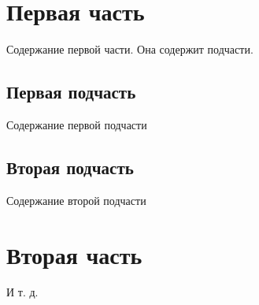 \documentclass[a4paper, 12pt]{article} %
\begin{document}
\section{Первая часть}

Содержание первой части. Она содержит подчасти.

\subsection{Первая подчасть}

Содержание первой подчасти

\subsection{Вторая подчасть}

Содержание второй подчасти

\section{Вторая часть}

И т. д.
\end{document}
